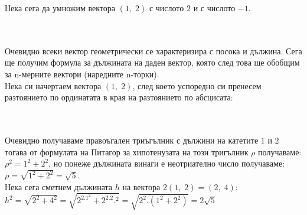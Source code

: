 \documentclass[12pt]{article}
\begin{document}
Нека сега да умножим вектора $(1, \; 2)$ с числото $2$ и с числото $-1$.\\

 \\\\

Очевидно всеки вектор геометрически се характеризира с посока и дължина. Сега ще получим формула за дължината на даден вектор,
която след това ще обобщим за n-мерните вектори (наредните n-торки). \\

Нека си начертаем вектора $(1, \; 2)$, след което успоредно си пренесем разтоянието по ординатата в края на разтоянието по абсцисата: \\

 \\\\

Очевидно получаваме правоъгален триъгълник с дължини на катетите $1$ и $2$ тогава от формулата на Питагор
за хипотенузата на този тригълник $\rho$ получаваме: \\
$\rho^2 = 1^2 + 2^2$, но понеже дължината винаги е неотриателно число получаваме: \\
$\rho = \sqrt{1^2 + 2^2} = \sqrt{5}$. \\

Нека сега сметнем дължината $h$ на вектора $2(1, \; 2) = (2, \; 4)$: \\
$h^2 = \sqrt{2^2 + 4^2} = \sqrt{2^2.1^2 + 2^2.2.^2} = \sqrt{2^2.(1^2 + 2^2)} = 2\sqrt{5}$ \\
\end{document}
